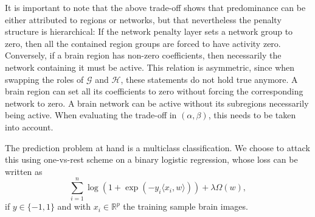 \documentclass{article}
\newcommand{\R}{\mathbb{R}}
\begin{document}
It is important to note that the above trade-off shows that predominance
can be either attributed to regions or networks, but that nevertheless the
penalty structure is hierarchical: If the network penalty layer sets a
network group to zero, then all the contained region groups are forced to
have activity zero. Conversely, if a brain region has non-zero coefficients,
then necessarily the network containing it must be active.
This relation is asymmetric, since when swapping the roles of \(\mathcal G\)
 and \(\mathcal H\), these statements do not hold true anymore. A brain 
region can set all its coefficients to zero without forcing the 
corresponding network to zero. A brain network can be active without its
subregions necessarily being active.
When evaluating the trade-off in \((\alpha, \beta)\), this needs to be taken
into account.

The prediction problem at hand is a multiclass classification. We choose to
attack this using one-vs-rest scheme on a binary logistic regression, whose
loss can be written as
\[\sum_{i=1}^n\log(1 + \exp(-y_i\langle x_i, w\rangle)) + \lambda\Omega(w),\]
if \(y\in\{-1, 1\}\) and with \(x_i\in\R^p\) the training sample brain images.
\end{document}

